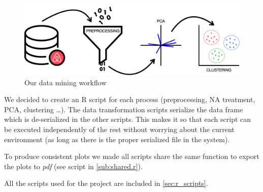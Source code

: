 \begin{figure}[H]
    \centering
    \includegraphics[width=0.6\linewidth]{images/workflow.pdf}
    \caption{Our data mining workflow}%
    \label{fig:airbnblistingsPlot.PNG}
\end{figure}

We decided to create an R script for each process (preprocessing, NA treatment,
PCA, clustering \dots). The data transformation scripts serialize the data frame
which is de-serialized in the other scripts. This makes it so that each script
can be executed independently of the rest without worrying about the current
environment (as long as there is the proper serialized file in the system).

To produce consistent plots we made all scripts share the same function to
export the plots to \emph{pdf} (see script in \cref{sub:shared.r}).

All the scripts used for the project are included in \cref{sec:r_scripts}.
